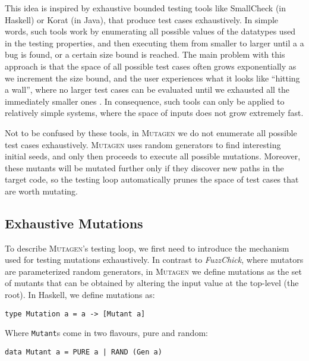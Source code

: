 \documentclass[acmsmall, anonymous]{acmart}
\newcommand{\fuzzchick}{\textit{FuzzChick}\xspace}
\newcommand{\mutagen}{\textsc{Mutagen}\xspace}
\begin{document}
This idea is inspired by exhaustive bounded testing tools like SmallCheck (in
Haskell) or Korat (in Java), that produce test cases exhaustively.
%
In simple words, such tools work by enumerating all possible values of the
datatypes used in the testing properties, and then executing them from smaller
to larger until a a bug is found, or a certain size bound is reached.
%
The main problem with this approach is that the space of all possible test cases
often grows exponentially as we increment the size bound, and the user
experiences what it looks like ``hitting a wall'', where no larger test cases
can be evaluated until we exhausted all the immediately smaller ones \cite{feat}.
%
In consequence, such tools can only be applied to relatively simple systems,
where the space of inputs does not grow extremely fast.


Not to be confused by these tools, in \mutagen we do not enumerate all possible
test cases exhaustively.
%
\mutagen uses random generators to find interesting initial seeds, and only then
proceeds to execute all possible mutations.
%
Moreover, these mutants will be mutated further only if they discover new paths
in the target code, so the testing loop automatically prunes the space of test
cases that are worth mutating.


\subsection{Exhaustive Mutations}

To describe \mutagen's testing loop, we first need to introduce the mechanism
used for testing mutations exhaustively.
%
In contrast to \fuzzchick, where mutators are parameterized random generators,
in \mutagen we define mutations as the set of mutants that can be obtained by
altering the input value at the top-level (the root).
%
In Haskell, we define mutations as:

\begin{verbatim}
type Mutation a = a -> [Mutant a]
\end{verbatim}

\noindent Where \texttt{Mutant}s come in two flavours, pure and random:

\begin{verbatim}
data Mutant a = PURE a | RAND (Gen a)
\end{verbatim}
\end{document}
